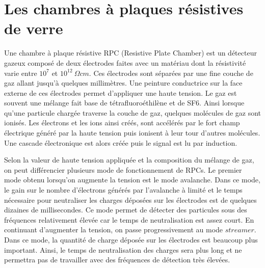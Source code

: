 \section{Les chambres à plaques résistives de verre}
\label{sec.grpc}
Une chambre à plaque résistive RPC (Resistive Plate Chamber) est un détecteur gazeux composé de deux électrodes faites avec un matériau dont la résistivité varie entre $10^7$ et $10^{12}~\Omega cm$. Ces électrodes sont séparées par une fine couche de gaz allant jusqu'à quelques millimètres. Une peinture conductrice sur la face externe de ces électrodes permet d'appliquer une haute tension. Le gaz est souvent une mélange fait base de tétrafluoroéthilène et de SF6. Ainsi lorsque qu'une particule chargée traverse la couche de gaz, quelques molécules de gaz sont ionisés. Les électrons et les ions ainsi créés, sont accélérés par le fort champ électrique généré par la haute tension puis ionisent à leur tour d'autres molécules. Une cascade électronique est alors créée puis le signal est lu par induction. 

Selon la valeur de haute tension appliquée et la composition du mélange de gaz, on peut différencier plusieurs mode de fonctionnement de RPCs. Le premier mode obtenu lorsqu'on augmente la tension est le mode avalanche. Dans ce mode, le gain sur le nombre d'électrons générés par l'avalanche à limité et le temps nécessaire pour neutraliser les charges déposées sur les électrodes est de quelques dizaines de millisecondes. Ce mode permet de détecter des particules sous des fréquences relativement élevée car le temps de neutralisation est assez court. En continuant d'augmenter la tension, on passe progressivement au mode $streamer$. Dans ce mode, la quantité de charge déposée sur les électrodes est beaucoup plus important. Ainsi, le temps de neutralisation des charges sera plus long et ne permettra pas de travailler avec des fréquences de détection très élevées.

